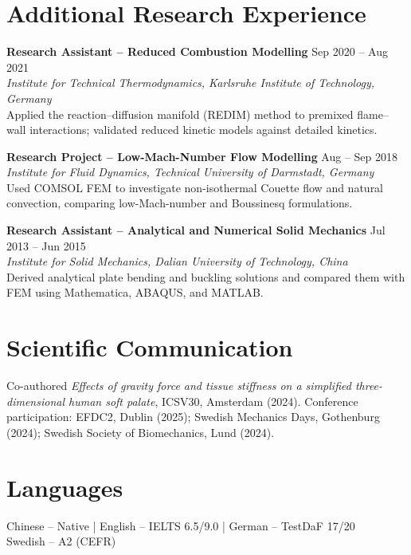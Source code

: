 \documentclass[a4paper,10pt]{article}
\begin{document}
\section{Additional Research Experience}
\textbf{Research Assistant -- Reduced Combustion Modelling} \hfill Sep 2020 -- Aug 2021\\
\textit{Institute for Technical Thermodynamics, Karlsruhe Institute of Technology, Germany}\\
Applied the reaction--diffusion manifold (REDIM) method to premixed flame--wall interactions;
validated reduced kinetic models against detailed kinetics.

\vspace{4pt}
\textbf{Research Project -- Low-Mach-Number Flow Modelling} \hfill Aug -- Sep 2018\\
\textit{Institute for Fluid Dynamics, Technical University of Darmstadt, Germany}\\
Used COMSOL FEM to investigate non-isothermal Couette flow and natural convection,
comparing low-Mach-number and Boussinesq formulations.

\vspace{4pt}
\textbf{Research Assistant -- Analytical and Numerical Solid Mechanics} \hfill Jul 2013 -- Jun 2015\\
\textit{Institute for Solid Mechanics, Dalian University of Technology, China}\\
Derived analytical plate bending and buckling solutions and compared them with FEM
using Mathematica, ABAQUS, and MATLAB.

\section{Scientific Communication}
Co-authored \textit{Effects of gravity force and tissue stiffness on a simplified
three-dimensional human soft palate}, ICSV30, Amsterdam (2024).
Conference participation: EFDC2, Dublin (2025); Swedish Mechanics Days, Gothenburg (2024);
Swedish Society of Biomechanics, Lund (2024).

\section{Languages}
Chinese -- Native \quad | \quad English -- IELTS 6.5/9.0 \quad | \quad
German -- TestDaF 17/20\\
Swedish -- A2 (CEFR)
\end{document}
